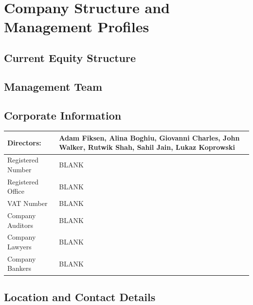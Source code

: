 \documentclass[11pt]{article}
\begin{document}
\newpage
\section{Company Structure and Management Profiles}
  \subsection{Current Equity Structure}
  \subsection{Management Team}
  \subsection{Corporate Information}
  \begin{table}[H]
  \begin{center}
  \begin{tabular}{| p{7cm} | p{7cm} |}
  \hline
  Directors:  & Adam Fiksen, \newline Alina Boghiu, \newline Giovanni Charles, \newline John Walker, \newline Rutwik Shah, \newline Sahil Jain, \newline Lukaz Koprowski  \\
  \hline
  Registered Number & BLANK \\
  \hline 
  Registered Office & BLANK \\
  \hline
  VAT Number        & BLANK \\
  \hline
  Company Auditors  & BLANK \\
  \hline
  Company Lawyers   & BLANK \\
  \hline
  Company Bankers   & BLANK \\
  \hline
  \end{tabular}
  \end{center}
  \end{table}


  \subsection{Location and Contact Details}
\newpage
\end{document}
